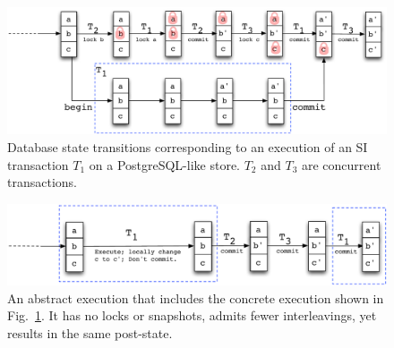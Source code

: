 \begin{figure}[t]
\includegraphics[scale=0.5]{Figures/RR-postgres}
\caption{Database state transitions corresponding to an execution of
  an SI transaction $T_1$ on a PostgreSQL-like store. $T_2$ and $T_3$
  are concurrent transactions. }
\label{fig:rr-postgres}
\end{figure}
\begin{figure}[t]
\includegraphics[scale=0.5]{Figures/RR-abstract}
  \caption{An abstract execution that includes the concrete execution
  shown in Fig.~\ref{fig:rr-postgres}. It has no locks or snapshots,
  admits fewer interleavings, yet results in the same post-state.  }
\label{fig:rr-abstract}
\end{figure}

